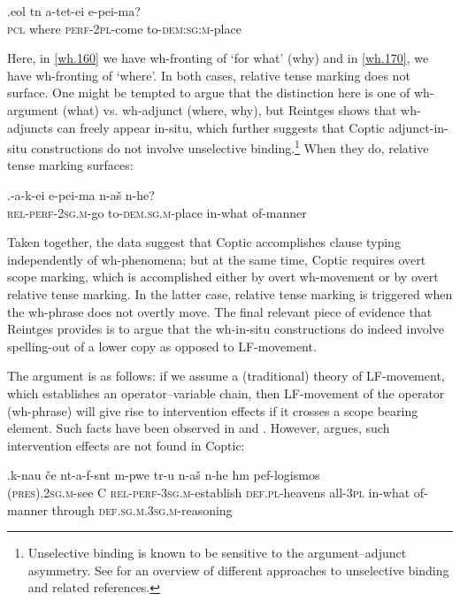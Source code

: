 \documentclass{glossa}
\begin{document}
\exg.\label{wh.170}e{\textbeta}ol t{\textopeno}n a-tet{\textschwa}-ei e-pei-ma?\\
   \textsc{pcl} where \textsc{perf-2pl}-come to-\textsc{dem:sg:m}-place\\

Here, in \ref{wh.160} we have wh-fronting of `for what' (why) and in \ref{wh.170}, we have wh-fronting of `where'. In both cases, relative tense marking does not surface. One might be tempted to argue that the distinction here is one of wh-argument (what) vs. wh-adjunct (where, why), but Reintges shows that wh-adjuncts can freely appear in-situ, which further suggests that Coptic adjunct-in-situ constructions do not involve unselective binding.\footnote{Unselective binding is known to be sensitive to the argument--adjunct asymmetry. See \cite{cheng:2009} for an overview of different approaches to unselective binding and related references.} When they do, relative tense marking surfaces:

\exg.\label{wh.180}{\textschwa}-a-k-ei e-pei-ma {\textschwa}n-a\v{s} {\textschwa}n-he?\\
   \textsc{rel-perf-2sg.m}-go to-\textsc{dem.sg.m}-place in-what of-manner\\

Taken together, the data suggest that Coptic accomplishes clause typing independently of wh-phenomena; but at the same time, Coptic requires overt scope marking, which is accomplished either by overt wh-movement or by overt relative tense marking. In the latter case, relative tense marking is triggered when the wh-phrase does not overtly move. The final relevant piece of evidence that Reintges provides is to argue that the wh-in-situ constructions do indeed involve spelling-out of a lower copy as opposed to LF-movement.

The argument is as follows: if we assume a (traditional) theory of LF-movement, which establishes an operator--variable chain, then LF-movement of the operator (wh-phrase) will give rise to intervention effects if it crosses a scope bearing element. Such facts have been observed in \cite{beck:1996} and \cite{beck-kim:1997}. However, \cite{reintges:2007} argues, such intervention effects are not found in Coptic:

\exg.\label{wh.181}k-nau \v{c}e {\textschwa}nt-a-f-s{\textschwa}nt {\textschwa}m-p{\textepsilon}we t{\textepsilon}r-u {\textschwa}n-a\v{s} {\textschwa}n-he h{\textschwa}m pef-logismos\\
   \textsc{(pres).2sg.m}-see C \textsc{rel-perf-3sg.m}-establish \textsc{def.pl}-heavens all-\textsc{3pl} in-what of-manner through \textsc{def.sg.m.3sg.m}-reasoning\\
\end{document}
